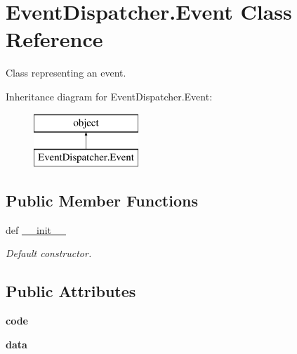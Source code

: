 \hypertarget{class_event_dispatcher_1_1_event}{\section{Event\-Dispatcher.\-Event Class Reference}
\label{class_event_dispatcher_1_1_event}
}


Class representing an event.  


Inheritance diagram for Event\-Dispatcher.\-Event\-:\begin{figure}[H]
\begin{center}
\leavevmode
\includegraphics[height=2.000000cm]{class_event_dispatcher_1_1_event}
\end{center}
\end{figure}
\subsection*{Public Member Functions}
\begin{DoxyCompactItemize}
\item 
\hypertarget{class_event_dispatcher_1_1_event_a7b12495347b4eb0c5b44f8b6749de7a0}{def \hyperlink{class_event_dispatcher_1_1_event_a7b12495347b4eb0c5b44f8b6749de7a0}{\-\_\-\-\_\-init\-\_\-\-\_\-}}\label{class_event_dispatcher_1_1_event_a7b12495347b4eb0c5b44f8b6749de7a0}

\begin{DoxyCompactList}\small\item\em Default constructor. \end{DoxyCompactList}\end{DoxyCompactItemize}
\subsection*{Public Attributes}
\begin{DoxyCompactItemize}
\item 
\hypertarget{class_event_dispatcher_1_1_event_aa87c86a13babd2b77d234f5d6d91feaa}{{\bfseries code}}\label{class_event_dispatcher_1_1_event_aa87c86a13babd2b77d234f5d6d91feaa}

\item 
\hypertarget{class_event_dispatcher_1_1_event_a254ec16bd2f1e54bd2767d35d2cbb976}{{\bfseries data}}\label{class_event_dispatcher_1_1_event_a254ec16bd2f1e54bd2767d35d2cbb976}

\end{DoxyCompactItemize}

